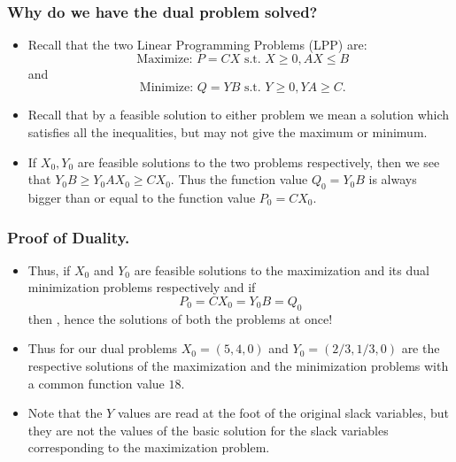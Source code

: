 

\begin{frame}%
 \frametitle{Why do we have the dual problem solved?}
  \begin{itemize}%
 
\item Recall that the two Linear Programming Problems (LPP)  are:
$$\mbox{ Maximize: } P=CX \mbox{ s.t. } X\ge 0, AX\le B $$
and
$$\mbox{ Minimize: } Q=YB \mbox{ s.t. } Y\ge 0, YA\ge C .$$

\item Recall that by a feasible solution to either problem we mean a
solution which satisfies all the inequalities, but may not give the
maximum or minimum.

\item If $X_0,Y_0$ are feasible solutions to the two problems
respectively, then we see that
$Y_0B \geq Y_0AX_0\ge CX_0$. Thus the function value $Q_0=Y_0B$ is always
bigger than or equal to the function value $P_0=CX_0$.



\end{itemize}
\end{frame}




\begin{frame}%
  \frametitle{Proof of Duality.}
  \begin{itemize}%

\item Thus, if $X_0$ and $Y_0$ are feasible solutions to the
maximization and its dual minimization problems respectively and if
$$P_0=CX_0 = Y_0B=Q_0$$
then , hence the solutions of both the problems at once!

\item Thus for our dual problems
$X_0=(5,4,0)$ and $Y_0=(2/3,1/3,0)$ are the respective solutions of the
maximization and the minimization problems with a common function value
$18$.

\item {} Note that the $Y$ values are read at the foot of
the original slack variables, but they are not the values of the basic
solution for the  slack variables  corresponding to the maximization
problem. 


\end{itemize}
\end{frame}


